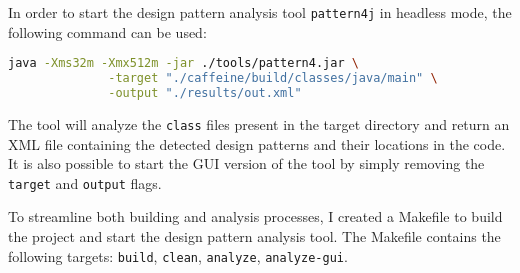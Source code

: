 \pagebreak

\noindent In order to start the design pattern analysis tool \texttt{pattern4j} in headless mode, the following command can be used:

\begin{lstlisting}[language=bash, caption={Bash command to start the pattern4j design pattern analysis in headless mode}]
            java -Xms32m -Xmx512m -jar ./tools/pattern4.jar \
              -target "./caffeine/build/classes/java/main" \
              -output "./results/out.xml"
\end{lstlisting}

\noindent The tool will analyze the \texttt{class} files present in the target directory and return an XML file containing the detected design patterns and their locations in the code. It is also possible to start the GUI version of the tool by simply removing the \texttt{target} and \texttt{output} flags.

To streamline both building and analysis processes, I created a Makefile to build the project and start the design pattern analysis tool. The Makefile contains the following targets: \texttt{build}, \texttt{clean}, \texttt{analyze}, \texttt{analyze-gui}.

